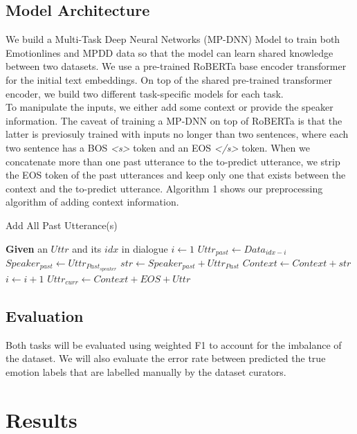 \documentclass[11pt]{article}
\begin{document}
\subsection{Model Architecture}

We build a Multi-Task Deep Neural Networks (MP-DNN) Model \citet{liu-etal-2019-multi} to train both Emotionlines and MPDD data so that the model can learn shared knowledge between two datasets. We use a pre-trained RoBERTa base encoder transformer for the initial text embeddings. On top of the shared pre-trained transformer encoder, we build two different task-specific models for each task. \\
To manipulate the inputs, we either add some context or provide the speaker information. The caveat of training a MP-DNN on top of RoBERTa is that the latter is previosuly trained with inputs no longer than two sentences, where each two sentence has a BOS \textit{<s>} token and an EOS \textit{</s>} token. When we concatenate more than one past utterance to the to-predict utterance, we strip the EOS token of the past utterances and keep only one that exists between the context and the to-predict utterance. Algorithm 1 shows our preprocessing algorithm of adding context information.
\begin{algorithm}
\caption{Add All Past Utterance(s)}\label{euclid}
\begin{algorithmic}[1]
\State \textbf{Given} an $Uttr$ and its $idx$ in dialogue
    \State $i \gets 1$
        \State $Uttr_{past} \gets Data_{idx-i}$
        \State $Speaker_{past} \gets Uttr_{Past_{speaker}}$
        \State $str \gets Speaker_{past} + Uttr_{Past}$
        \State $Context \gets Context + str$
        \State $i \gets i + 1$
    \EndWhile
\EndIf
\State $Uttr_{curr} \gets Context + EOS + Uttr$
\end{algorithmic}
\end{algorithm}

\subsection{Evaluation}

Both tasks will be evaluated using weighted F1 to account for the imbalance of the dataset. We will also evaluate the error rate between predicted the true emotion labels that are labelled manually by the dataset curators. 


\section{Results}
\label{sec:results}
\end{document}
